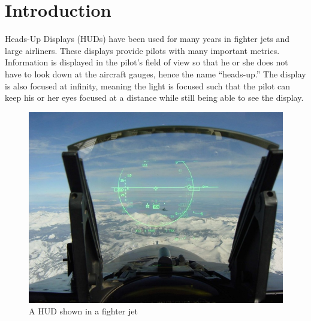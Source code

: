 \chapter{Introduction}




Heads-Up Displays (HUDs) have been used for many years in fighter jets and
large airliners. These displays provide pilots with many important metrics.
Information is displayed in the pilot's field of view so that he or she
does not have to look down at the aircraft gauges, hence the name
``heads-up.'' The display is also focused at infinity, meaning the light is
focused such that the pilot can keep his or her eyes focused at a distance
while still being able to see the display.

\begin{figure}[h]
\includegraphics[width=\textwidth]{img/JetHUD.jpg}
\caption{A HUD shown in a fighter jet}
\label{fig:jetHUD}
\end{figure}

